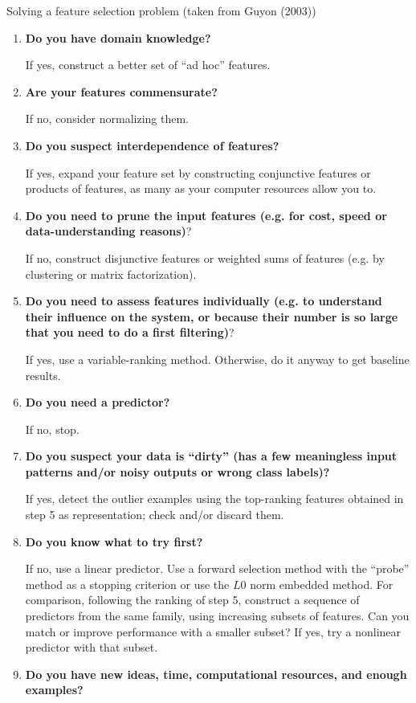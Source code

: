 








\begin{vbframe}{Solving a feature selection problem (taken from Guyon (2003))}

\begin{enumerate}
  \item {\bf Do you have domain knowledge?}

    If yes, construct a better set of \enquote{ad hoc} features.
  \item {\bf Are your features commensurate?}

    If no, consider normalizing them.
  \item {\bf Do you suspect interdependence of features?}

  If yes, expand your feature set by constructing conjunctive features or products of features, as many as your computer resources allow you to.
  \item {\bf Do you need to prune the input features (e.g. for cost, speed or data-understanding reasons)}?

  If no, construct disjunctive features or weighted sums of features (e.g. by clustering or matrix factorization).
  \item {\bf Do you need to assess features individually (e.g. to understand their influence on the system, or because their number is so large that you need to do a first filtering)}?

  If yes, use a variable-ranking method.
  Otherwise, do it anyway to get baseline results.
  \item {\bf Do you need a predictor?}

  If no, stop.
  \item {\bf Do you suspect your data is \enquote{dirty} (has a few meaningless input patterns and/or noisy outputs or wrong class labels)?}

  If yes, detect the outlier examples using the top-ranking features obtained in step 5 as representation; check and/or discard them.
  \item {\bf Do you know what to try first?}

  If no, use a linear predictor.
  Use a forward selection method with the \enquote{probe} method as a stopping criterion or use the $L0$ norm embedded method.
  For comparison, following the ranking of step 5, construct a sequence of predictors from the same family, using increasing subsets of features.
  Can you match or improve performance with a smaller subset?
  If yes, try a nonlinear predictor with that subset.
  \item {\bf Do you have new ideas, time, computational resources, and enough examples?}


\end{enumerate}
\end{vbframe}
